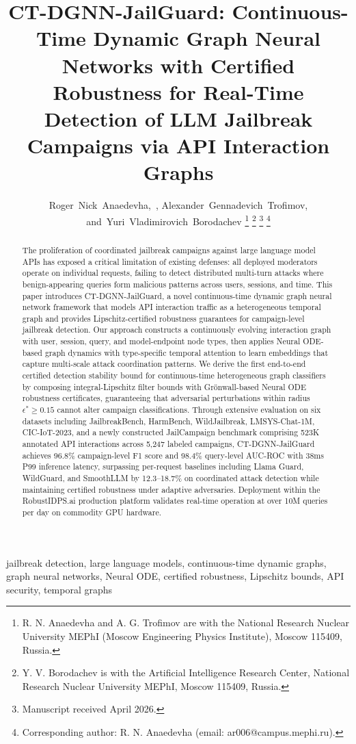 \documentclass[journal]{IEEEtran}
\title{CT-DGNN-JailGuard: Continuous-Time Dynamic Graph Neural Networks with Certified Robustness for Real-Time Detection of LLM Jailbreak Campaigns via API Interaction Graphs}
\author{Roger~Nick~Anaedevha,~\IEEEmembership{Member,~IEEE},
        Alexander~Gennadevich~Trofimov,
        and~Yuri~Vladimirovich~Borodachev%
\thanks{R. N. Anaedevha and A. G. Trofimov are with the National Research Nuclear University MEPhI (Moscow Engineering Physics Institute), Moscow 115409, Russia.}%
\thanks{Y. V. Borodachev is with the Artificial Intelligence Research Center, National Research Nuclear University MEPhI, Moscow 115409, Russia.}%
\thanks{Manuscript received April 2026.}%
\thanks{Corresponding author: R. N. Anaedevha (email: ar006@campus.mephi.ru).}}
\theoremstyle{plain}
\theoremstyle{definition}
\theoremstyle{remark}
\begin{document}
\maketitle

\begin{abstract}
The proliferation of coordinated jailbreak campaigns against large language model APIs has exposed a critical limitation of existing defenses: all deployed moderators operate on individual requests, failing to detect distributed multi-turn attacks where benign-appearing queries form malicious patterns across users, sessions, and time. This paper introduces CT-DGNN-JailGuard, a novel continuous-time dynamic graph neural network framework that models API interaction traffic as a heterogeneous temporal graph and provides Lipschitz-certified robustness guarantees for campaign-level jailbreak detection. Our approach constructs a continuously evolving interaction graph with user, session, query, and model-endpoint node types, then applies Neural ODE-based graph dynamics with type-specific temporal attention to learn embeddings that capture multi-scale attack coordination patterns. We derive the first end-to-end certified detection stability bound for continuous-time heterogeneous graph classifiers by composing integral-Lipschitz filter bounds with Gr\"onwall-based Neural ODE robustness certificates, guaranteeing that adversarial perturbations within radius $\epsilon^* \geq 0.15$ cannot alter campaign classifications. Through extensive evaluation on six datasets including JailbreakBench, HarmBench, WildJailbreak, LMSYS-Chat-1M, CIC-IoT-2023, and a newly constructed JailCampaign benchmark comprising 523K annotated API interactions across 5,247 labeled campaigns, CT-DGNN-JailGuard achieves 96.8\% campaign-level F1 score and 98.4\% query-level AUC-ROC with 38ms P99 inference latency, surpassing per-request baselines including Llama Guard, WildGuard, and SmoothLLM by 12.3--18.7\% on coordinated attack detection while maintaining certified robustness under adaptive adversaries. Deployment within the RobustIDPS.ai production platform validates real-time operation at over 10M queries per day on commodity GPU hardware.
\end{abstract}

\begin{IEEEkeywords}
jailbreak detection, large language models, continuous-time dynamic graphs, graph neural networks, Neural ODE, certified robustness, Lipschitz bounds, API security, temporal graphs
\end{IEEEkeywords}
\end{document}
